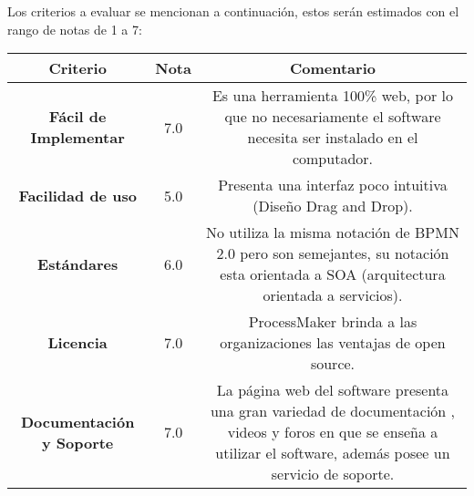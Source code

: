 Los criterios a evaluar se mencionan a continuación, estos serán estimados con el rango de notas de 1 a 7:

\begin{tabular}{|c|c|c|}
 \hline
 \textbf{Criterio} & \textbf{Nota} & \textbf{Comentario} \\
 \hline
 \textbf{Fácil de Implementar} & 7.0 & Es una herramienta 100\% web, por lo que no necesariamente el software necesita ser instalado en el computador. \\
 \hline
 \textbf{Facilidad de uso} & 5.0 & Presenta una interfaz poco intuitiva (Diseño Drag and Drop). \\
 \hline
 \textbf{Estándares} & 6.0 & No utiliza la misma notación de BPMN 2.0 pero son semejantes, su notación esta orientada a SOA (arquitectura orientada a servicios). \\
 \hline
 \textbf{Licencia} & 7.0 & ProcessMaker brinda a las organizaciones las ventajas de open source. \\
 \hline
 \textbf{Documentación y Soporte} & 7.0 & La página web del software presenta una gran variedad de documentación , videos y foros en que se enseña a utilizar el software, además posee un servicio de soporte. \\
 \hline
\end{tabular}